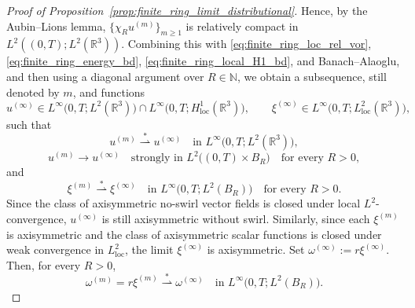\documentclass[reqno,11pt]{amsart}
\begin{document}
\begin{proof}[Proof of Proposition~\ref{prop:finite_ring_limit_distributional}]
Hence, by the Aubin--Lions lemma,
\(\{\chi_R u^{(m)}\}_{m\ge 1}\) is relatively compact in
\(L^2((0,T);L^2(\mathbb{R}^3))\).
Combining this with
\eqref{eq:finite_ring_loc_rel_vor},
\eqref{eq:finite_ring_energy_bd}, \eqref{eq:finite_ring_local_H1_bd},
and Banach--Alaoglu, and then using a diagonal argument over \(R\in\mathbb{N}\), we
obtain a subsequence, still denoted by \(m\), and functions
\[
u^{(\infty)}\in L^\infty\big(0,T;L^2(\mathbb{R}^3)\big)
\cap L^\infty\big(0,T;H^1_{\mathrm{loc}}(\mathbb{R}^3)\big),
\qquad
\xi^{(\infty)}\in L^\infty\big(0,T;L^2_{\mathrm{loc}}(\mathbb{R}^3)\big),
\]
such that
\[
u^{(m)}\overset{*}{\rightharpoonup} u^{(\infty)}
\quad\text{in }L^\infty\big(0,T;L^2(\mathbb{R}^3)\big),
\]
\[
u^{(m)}\to u^{(\infty)}
\quad\text{strongly in }L^2\big((0,T)\times B_R\big)
\quad\text{for every }R>0,
\]
and
\[
\xi^{(m)}\overset{*}{\rightharpoonup} \xi^{(\infty)}
\quad\text{in }L^\infty\big(0,T;L^2(B_R)\big)
\quad\text{for every }R>0.
\]
Since the class of axisymmetric no-swirl vector fields is closed under local
\(L^2\)-convergence, \(u^{(\infty)}\) is still axisymmetric without swirl. 
Similarly, since each \(\xi^{(m)}\) is axisymmetric and the class of axisymmetric
scalar functions is closed under weak convergence in \(L^2_{\mathrm{loc}}\),
the limit \(\xi^{(\infty)}\) is axisymmetric.
Set \(\omega^{(\infty)}:=r\xi^{(\infty)}\).
Then, for every \(R>0\),
\[
\omega^{(m)}=r\xi^{(m)}\overset{*}{\rightharpoonup}\omega^{(\infty)}
\quad\text{in }L^\infty\big(0,T;L^2(B_R)\big).
\]


\end{proof}
\end{document}
